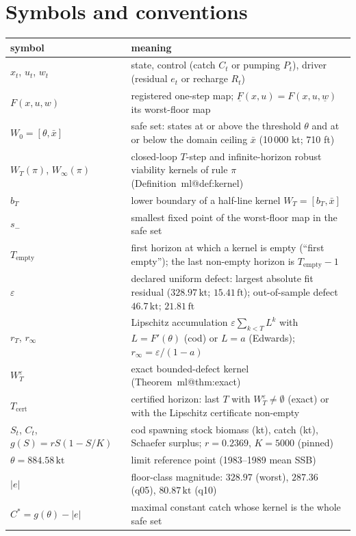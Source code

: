 \documentclass[11pt,a4paper]{article}
\makeatletter
\newcommand{\safe}{W_0}
\newcommand{\LRP}{\theta}
\newcommand{\Cstar}{C^{*}}
\newcommand{\Tcert}{T_{\mathrm{cert}}}
\newcommand{\Tempty}{T_{\mathrm{empty}}}
\newcommand{\kt}{\,\mathrm{kt}}
\newcommand{\ft}{\,\mathrm{ft}}
\newcommand{\mref}[1]{\csname ml@#1\endcsname}
\makeatother
\begin{document}
\section{Symbols and conventions}\label{si:symbols}
\begin{longtable}{p{}p{}}
\toprule
symbol & meaning \\
\midrule
\endhead
$x_t$, $u_t$, $w_t$ & state, control (catch $C_t$ or pumping $P_t$), driver (residual $e_t$ or recharge $R_t$) \\
$F(x,u,w)$ & registered one-step map; $\underline F(x,u)=F(x,u,\underline w)$ its worst-floor map \\
$\safe=[\LRP,\bar x]$ & safe set: states at or above the threshold $\LRP$ and at or below the domain ceiling $\bar x$ (10\,000 kt; 710 ft) \\
$W_T(\pi)$, $W_\infty(\pi)$ & closed-loop $T$-step and infinite-horizon robust viability kernels of rule $\pi$ (Definition~\mref{def:kernel}) \\
$b_T$ & lower boundary of a half-line kernel $W_T=[b_T,\bar x]$ \\
$s_-$ & smallest fixed point of the worst-floor map in the safe set \\
$\Tempty$ & first horizon at which a kernel is empty (``first empty''); the last non-empty horizon is $\Tempty-1$ \\
$\varepsilon$ & declared uniform defect: largest absolute fit residual ($328.97\kt$; $15.41\ft$); out-of-sample defect $46.7\kt$; $21.81\ft$ \\
$r_T$, $r_\infty$ & Lipschitz accumulation $\varepsilon\sum_{k<T}L^k$ with $L=F'(\LRP)$ (cod) or $L=a$ (Edwards); $r_\infty=\varepsilon/(1-a)$ \\
$W^{\varepsilon}_T$ & exact bounded-defect kernel (Theorem~\mref{thm:exact}) \\
$\Tcert$ & certified horizon: last $T$ with $W^{\varepsilon}_T\neq\emptyset$ (exact) or with the Lipschitz certificate non-empty \\
\midrule
$S_t$, $C_t$, $g(S)=rS(1-S/K)$ & cod spawning stock biomass (kt), catch (kt), Schaefer surplus; $r=0.2369$, $K=5000$ (pinned) \\
$\LRP=884.58\kt$ & limit reference point (1983--1989 mean SSB) \\
$|e|$ & floor-class magnitude: $328.97$ (worst), $287.36$ (q05), $80.87\kt$ (q10) \\
$\Cstar=g(\LRP)-|e|$ & maximal constant catch whose kernel is the whole safe set \\

\end{longtable}
\end{document}
